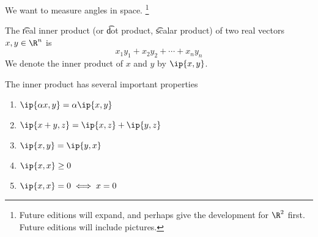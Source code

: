 
We want to measure angles in space.
  \ifhmode\unskip\fi\footnote{
Future editions will expand, and perhaps give the development for $\R^2$ first.
Future editions will include pictures.
  }

The \t{real inner product} (or \t{dot product}, \t{scalar product}) of two real vectors $x, y \in \R^n$ is
  \[
x_1y_1 + x_2y_2 + \cdots + x_ny_n
  \]
We denote the inner product of $x$ and $y$ by $\ip{x,y}$.

The inner product has several important properties
  \begin{enumerate}
  \item $\ip{\alpha x, y} = \alpha\ip{x, y}$
  \item $\ip{x + y, z} = \ip{x, z} + \ip{y, z}$
  \item $\ip{x, y} = \ip{y, x}$
  \item $\ip{x,x} \geq 0$
  \item $\ip{x,x} = 0 \iff x = 0$
  \end{enumerate}

\blankpage
